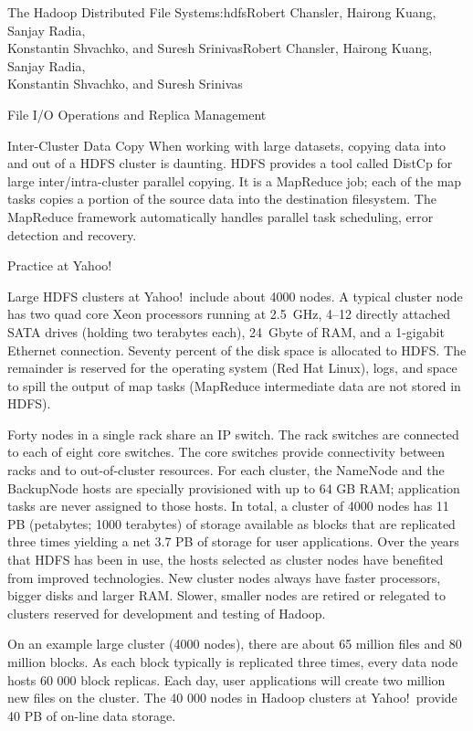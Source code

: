 \begin{aosachaptertoc}{The Hadoop Distributed File System}{s:hdfs}{Robert Chansler, Hairong Kuang, Sanjay Radia, \\ Konstantin Shvachko, and Suresh Srinivas}{Robert Chansler, Hairong Kuang, Sanjay Radia, \\ \hspace*{0.9cm} Konstantin Shvachko, and Suresh Srinivas}
\begin{aosasect1}{File I/O Operations and Replica Management}
\begin{aosasect2}{Inter-Cluster Data Copy}
When working with large datasets, copying data into and out of a HDFS
cluster is daunting.  HDFS provides a tool called DistCp for large
inter/intra-cluster parallel copying. It is a MapReduce job; each of
the map tasks copies a portion of the source data into the destination
filesystem. The MapReduce framework automatically handles parallel
task scheduling, error detection and recovery.

\end{aosasect2}

\end{aosasect1}

\begin{aosasect1}{Practice at Yahoo!}

Large HDFS clusters at Yahoo!\ include about 4000 nodes. A typical
cluster node has two quad core Xeon processors running at 2.5~GHz,
4--12 directly attached SATA drives (holding two terabytes each), 24~Gbyte of
RAM, and a 1-gigabit Ethernet connection.  Seventy percent of the disk
space is allocated to HDFS\@. The remainder is reserved for the
operating system (Red Hat Linux), logs, and space to spill the output
of map tasks (MapReduce intermediate data are not stored in HDFS).

Forty nodes in a single rack share an IP switch. The rack switches are
connected to each of eight core switches. The core switches provide
connectivity between racks and to out-of-cluster resources. For each
cluster, the NameNode and the BackupNode hosts are specially
provisioned with up to 64 GB RAM; application tasks are never assigned
to those hosts. In total, a cluster of 4000 nodes has 11 PB
(petabytes; 1000 terabytes) of storage available as blocks that are
replicated three times yielding a net 3.7 PB of storage for user
applications. Over the years that HDFS has been in use, the hosts
selected as cluster nodes have benefited from improved
technologies. New cluster nodes always have faster processors, bigger
disks and larger RAM\@. Slower, smaller nodes are retired or relegated
to clusters reserved for development and testing of Hadoop.

On an example large cluster (4000 nodes), there are about 65 million
files and 80 million blocks. As each block typically is replicated
three times, every data node hosts 60 000 block replicas. Each day,
user applications will create two million new files on the
cluster. The 40 000 nodes in Hadoop clusters at Yahoo!\ provide 40 PB
of on-line data storage.


\end{aosasect1}
\end{aosachaptertoc}
